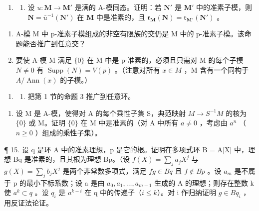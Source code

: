 \begin{enumerate}
\def\labelenumi{\arabic{enumi}.}
\setcounter{enumi}{12}
\tightlist
\item
  \begin{enumerate}
  \def\labelenumii{(\alph{enumii})}
  \tightlist
  \item
    设 \(u: \mathbf{M} \to \mathbf{M}'\) 是满的 A-模同态。证明：若 \(\mathbf{N}'\) 是 \(\mathbf{M}'\) 中的准素子模，则 \(\mathbf{N} = \bar{u}^{-1}(\mathbf{N}')\) 在 \(\mathbf{M}\) 中是准素的，且 \(\mathfrak{r}_{\mathbf{M}}(\mathbf{N}) = \mathfrak{r}_{\mathbf{M}'}(\mathbf{N}')\) 。
  \end{enumerate}
\end{enumerate}

\begin{enumerate}
\def\labelenumi{(\alph{enumi})}
\setcounter{enumi}{1}
\item
  A-模 M 中 p-准素子模组成的非空有限族的交仍是 M 中的 p-准素子模。该命题能否推广到任意交？
\item
  要使 A-模 M 满足 \(\{0\}\) 在 M 中是 p-准素的，必须且只需对 M 的每个子模 \(N \neq 0\) 有 \(\operatorname{Supp}(N) = V(p)\) 。（注意对所有 \(x \in M\) ，M 含有一个同构于 \(A/\operatorname{Ann}(x)\) 的子模。）
\end{enumerate}

\begin{enumerate}
\def\labelenumi{\arabic{enumi}.}
\setcounter{enumi}{13}
\tightlist
\item
  \begin{enumerate}
  \def\labelenumii{(\alph{enumii})}
  \tightlist
  \item
    把第 1 节的命题 3 推广到任意环。
  \end{enumerate}
\end{enumerate}

\begin{enumerate}
\def\labelenumi{(\alph{enumi})}
\setcounter{enumi}{1}
\tightlist
\item
  设 M 是 A-模，使得对 A 的每个乘性子集 S，典范映射 \(M \rightarrow S^{-1}M\) 的核为 \(\{0\}\) 或 M。证明 \(\{0\}\) 在 M 中是准素的（对 A 中所有 \(a \neq 0\) ，考虑由 \(a^{n}\) （ \(n \geqslant 0\) ）组成的乘性子集）。
\end{enumerate}

¶ 15. 设 q 是环 A 中的准素理想，p 是它的根。证明在多项式环 B = A{[}X{]} 中，理想 Bq 是准素的，且其根为理想 Bp。（设 \(f(X) = \sum_{j} a_j X^j\) 与 \(g(X) = \sum_{j} b_j X^j\) 是两个非常数多项式，满足 \(fg \in Bq\) 且 \(f \notin Bp\) 。设 \(a_m\) 是不属于 p 的最小下标系数；设 a 是由 \(a_0, a_1, \ldots, a_{m-1}\) 生成的 A 的理想；则存在整数 k 使 \(a^k \subset q\) 。设 \(q_i\) 是 \(a^{k-i}\) 在 q 中的传递子（\(i \leqslant k\)）。对 i 作归纳证明 \(g \in Bq_i\) ，用反证法论证。

